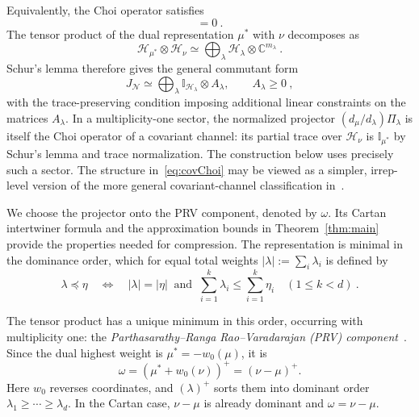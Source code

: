 \documentclass[a4paper,onecolumn,11pt]{quantumarticle}
\def\id{\mathbb{I}}
\begin{document}
Equivalently, the Choi operator satisfies
\cite[Lemma~11]{gschwendtner2021programmability}
\begin{equation}
    [J_{\mathcal{N}},U_\mu^*\otimes U_\nu]=0\ .
\end{equation}
The tensor product of the dual representation $\mu^*$ with $\nu$ decomposes as
\begin{equation}\label{eq:decomp}
    \mathcal H_{\mu^*}\otimes\mathcal H_\nu
    \simeq \bigoplus_\lambda \mathcal H_\lambda\otimes\mathbb C^{m_\lambda}\ .
\end{equation}
Schur's lemma therefore gives the general commutant form
\begin{equation}\label{eq:covChoi}
    J_\mathcal N\simeq
    \bigoplus_\lambda \id_{\mathcal H_\lambda}\otimes A_\lambda,
    \qquad A_\lambda\ge0\ ,
\end{equation}
with the trace-preserving condition imposing additional linear constraints on the matrices $A_\lambda$. In a multiplicity-one sector, the normalized projector $(d_\mu/d_\lambda)\Pi_\lambda$ is itself the Choi operator of a covariant channel: its partial trace over $\mathcal H_\nu$ is $\id_{\mu^*}$ by Schur's lemma and trace normalization. The construction below uses precisely such a sector.
The structure in~\eqref{eq:covChoi} may be viewed as a simpler, irrep-level version of the more general covariant-channel classification in~\cite{mancinska2025classification}.

We choose the projector onto the PRV component, denoted by $\omega$.
Its Cartan intertwiner formula and the approximation bounds in
Theorem~\ref{thm:main} provide the properties needed for compression.
The representation is minimal in the dominance order, which for equal
total weights $|\lambda|:=\sum_i\lambda_i$ is defined by
\begin{equation}\label{eq:dominance}
    \lambda\preceq\eta
    \quad\Longleftrightarrow\quad
    |\lambda|=|\eta|\ \text{ and }\
    \sum_{i=1}^k\lambda_i\le\sum_{i=1}^k\eta_i
    \quad(1\le k<d)\ .
\end{equation}

The tensor product has a unique minimum in this order, occurring with
multiplicity one: the \emph{Parthasarathy--Ranga Rao--Varadarajan
(PRV) component}~\cite{parthasarathy1967,kumar1988proof}.
Since the dual highest weight is $\mu^*=-w_0(\mu)$, it is
\begin{equation}
    \omega=(\mu^*+w_0(\nu))^+=(\nu-\mu)^+.
\end{equation}
Here $w_0$ reverses coordinates, and $(\lambda)^+$ sorts them into
dominant order $\lambda_1\ge\cdots\ge\lambda_d$.
In the Cartan case, $\nu-\mu$ is already dominant and
$\omega=\nu-\mu$.
\end{document}
